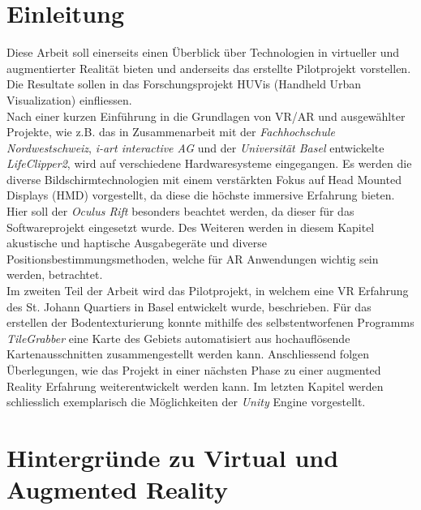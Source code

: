\chapter{Einleitung}
\vspace{-20pt}
Diese Arbeit soll einerseits einen Überblick über Technologien in virtueller und augmentierter Realität bieten und anderseits das erstellte Pilotprojekt vorstellen. Die Resultate sollen in das Forschungsprojekt HUVis (Handheld Urban Visualization) einfliessen.\\[6pt]
Nach einer kurzen Einführung in die Grundlagen von VR/AR und ausgewählter Projekte, wie z.B. das in Zusammenarbeit mit der \textit{Fachhochschule Nordwestschweiz}, \textit{i-art interactive AG} und der \textit{Universität Basel} entwickelte \textit{LifeClipper2}, wird auf verschiedene Hardwaresysteme eingegangen. Es werden die diverse Bildschirmtechnologien mit einem verstärkten Fokus auf Head Mounted Displays (HMD) vorgestellt, da diese die höchste immersive Erfahrung bieten. Hier soll der \textit{Oculus Rift} besonders beachtet werden, da dieser für das Softwareprojekt eingesetzt wurde. Des Weiteren werden in diesem Kapitel akustische und haptische Ausgabegeräte und diverse Positionsbestimmungsmethoden, welche für AR Anwendungen wichtig sein werden, betrachtet.\\[6pt]
Im zweiten Teil der Arbeit wird das Pilotprojekt, in welchem eine VR Erfahrung des St. Johann Quartiers in Basel entwickelt wurde, beschrieben. Für das erstellen der Bodentexturierung konnte mithilfe des selbstentworfenen Programms \textit{TileGrabber} eine Karte des Gebiets automatisiert aus hochauflösende Kartenausschnitten zusammengestellt werden kann. Anschliessend folgen Überlegungen, wie das Projekt in einer nächsten Phase zu einer augmented Reality Erfahrung weiterentwickelt werden kann. Im letzten Kapitel werden schliesslich exemplarisch die Möglichkeiten der \textit{Unity} Engine vorgestellt.

\chapter{Hintergründe zu Virtual und Augmented Reality}\label{c.wasist}
\vspace{-20pt}

